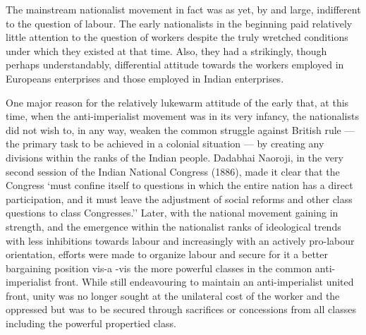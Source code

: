 The mainstream nationalist movement in fact was as yet, by and large, indifferent to the question of labour. The early nationalists in the beginning paid relatively little attention to the question of workers despite the truly wretched conditions under which they existed at that time. Also, they had a strikingly, though perhaps understandably, differential attitude towards the workers employed in Europeans enterprises and those employed in Indian enterprises.

One major reason for the relatively lukewarm attitude of the early that, at this time, when the anti-imperialist movement was in its very infancy, the nationalists did not wish to, in any way, weaken the common struggle against British rule --- the primary task to be achieved in a colonial situation --- by creating any divisions within the ranks of the Indian people. Dadabhai Naoroji, in the very second session of the Indian National Congress (1886), made it clear that the Congress `must confine itself to questions in which the entire nation has a direct participation, and it must leave the adjustment of social reforms and other class questions to class Congresses.'' Later, with the national movement gaining in strength, and the emergence within the nationalist ranks of ideological trends with less inhibitions towards labour and increasingly with an actively pro-labour orientation, efforts were made to organize labour and secure for it a better bargaining position vis-a -vis the more powerful classes in the common anti-imperialist front. While still endeavouring to maintain an anti-imperialist united front, unity was no longer sought at the unilateral cost of the worker and the oppressed but was to be secured through sacrifices or concessions from all classes including the powerful propertied class.

